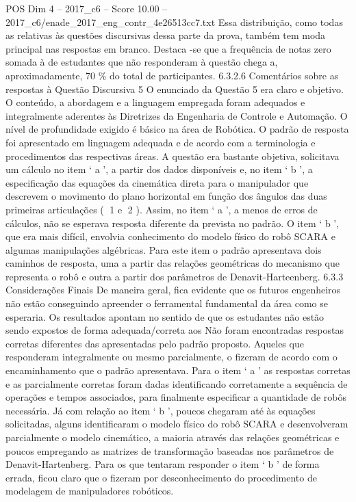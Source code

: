 \begin{textsample}{POS Dim 4 – 2017\_c6 – Score 10.00 – 2017\_c6/enade\_2017\_eng\_contr\_4e26513cc7.txt}
Essa distribuição, como todas as relativas às questões discursivas dessa parte da prova, também tem moda principal nas respostas em branco.
Destaca -se que a frequência de notas zero somada à de estudantes que não responderam à questão chega a, aproximadamente, 70 \% do total de participantes. 6.3.2.6 Comentários sobre as respostas à Questão Discursiva 5 O enunciado da Questão 5 era claro e objetivo.
O conteúdo, a abordagem e a linguagem empregada foram adequados e integralmente aderentes às Diretrizes da Engenharia de Controle e Automação.
O nível de profundidade exigido é básico na área de Robótica.
O padrão de resposta foi apresentado em linguagem adequada e de acordo com a terminologia e procedimentos das respectivas áreas.
A questão era bastante objetiva, solicitava um cálculo no item ‘ a ’, a partir dos dados disponíveis e, no item ‘ b ’, a especificação das equações da cinemática direta para o manipulador que descrevem o movimento do plano horizontal em função dos ângulos das duas primeiras articulações ( 1 e 2 ).
Assim, no item ‘ a ’, a menos de erros de cálculos, não se esperava resposta diferente da prevista no padrão.
O item ‘ b ’, que era mais difícil, envolvia conhecimento do modelo físico do robô SCARA e algumas manipulações algébricas.
Para este item o padrão apresentava dois caminhos de resposta, uma a partir das relações geométricas do mecanismo que representa o robô e outra a partir dos parâmetros de Denavit-Harteenberg. 6.3.3 Considerações Finais De maneira geral, fica evidente que os futuros engenheiros não estão conseguindo apreender o ferramental fundamental da área como se esperaria.
Os resultados apontam no sentido de que os estudantes não estão sendo expostos de forma adequada/correta aos Não foram encontradas respostas corretas diferentes das apresentadas pelo padrão proposto.
Aqueles que responderam integralmente ou mesmo parcialmente, o fizeram de acordo com o encaminhamento que o padrão apresentava.
Para o item ‘ a ’ as respostas corretas e as parcialmente corretas foram dadas identificando corretamente a sequência de operações e tempos associados, para finalmente especificar a quantidade de robôs necessária.
Já com relação ao item ‘ b ’, poucos chegaram até às equações solicitadas, alguns identificaram o modelo físico do robô SCARA e desenvolveram parcialmente o modelo cinemático, a maioria através das relações geométricas e poucos empregando as matrizes de transformação baseadas nos parâmetros de Denavit-Hartenberg.
Para os que tentaram responder o item ‘ b ’ de forma errada, ficou claro que o fizeram por desconhecimento do procedimento de modelagem de manipuladores robóticos.

\end{textsample}
